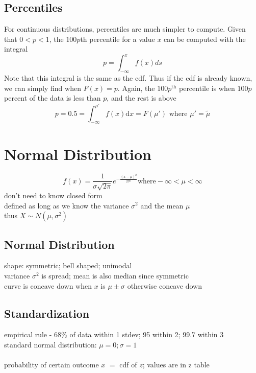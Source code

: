 \subsection{Percentiles}  %
For continuous distributions, percentiles are much simpler to compute. Given that $0<p<1$, the $100p$th percentile for a value $x$ can be computed with the integral
\begin{equation}
    p=\int_{-\infty}^{x} f(x)ds
\end{equation}
Note that this integral is the same as the cdf. Thus if the cdf is already known, we can simply find when $F(x)=p$. Again, the $100p^{\text{th}}$ percentile is when $100p$ percent of the data is less than $p$, and the rest is above\\
\begin{equation}
    p=0.5=\int_{-\infty}^{\mu'} f(x)\mathrm{d}x=F(\mu')\text{ where } \mu'=\tilde{\mu}
\end{equation}

\section{Normal Distribution}  %
\begin{equation}
    f(x)=\frac{1}{\sigma \sqrt{2\pi}}e^{-\frac{(x-\mu)^2}{2\sigma^2}} \mathrm{ where } -\infty<\mu<\infty
\end{equation}
don't need to know closed form \\
defined as long as we know the variance $\sigma^2$ and the mean $\mu$ \\
thus $X\sim N(\mu, \sigma^2)$
\subsection{Normal Distribution}  %
shape: symmetric; bell shaped; unimodal \\
variance $\sigma^2$ is spread; mean is also median since symmetric \\
curve is concave down when $x$ is $\mu\pm\sigma$ otherwise concave down

\subsection{Standardization}  %
empirical rule - 68\% of data within 1 stdev; 95 within 2; 99.7 within 3 \\
standard normal distribution: $\mu=0; \sigma=1$\\
\\
probability of certain outcome $x$ $=$ cdf of $z$; values are in z table \\


